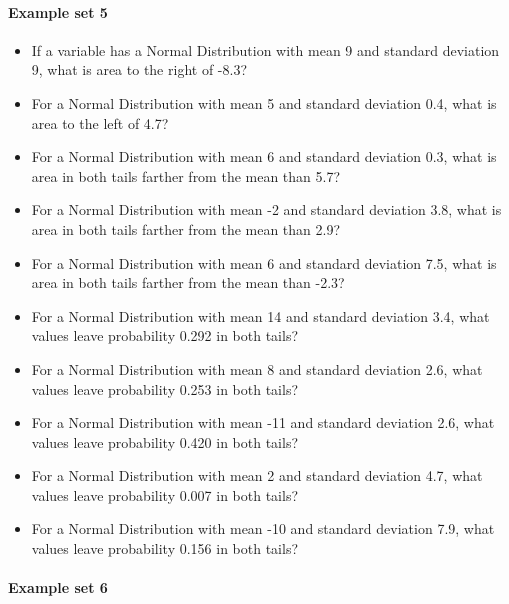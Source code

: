 \documentclass[]{article}
\providecommand{\tightlist}{%
  \setlength{\itemsep}{0pt}\setlength{\parskip}{0pt}}
\let\oldparagraph\paragraph
\renewcommand{\paragraph}[1]{\oldparagraph{#1}\mbox{}}
\begin{document}
\paragraph{Example set 5}\label{example-set-5}

\begin{itemize}
\tightlist
\item
  If a variable has a Normal Distribution with mean 9 and standard
  deviation 9, what is area to the right of -8.3?
\item
  For a Normal Distribution with mean 5 and standard deviation 0.4, what
  is area to the left of 4.7?
\item
  For a Normal Distribution with mean 6 and standard deviation 0.3, what
  is area in both tails farther from the mean than 5.7?
\item
  For a Normal Distribution with mean -2 and standard deviation 3.8,
  what is area in both tails farther from the mean than 2.9?
\item
  For a Normal Distribution with mean 6 and standard deviation 7.5, what
  is area in both tails farther from the mean than -2.3?
\item
  For a Normal Distribution with mean 14 and standard deviation 3.4,
  what values leave probability 0.292 in both tails?
\item
  For a Normal Distribution with mean 8 and standard deviation 2.6, what
  values leave probability 0.253 in both tails?
\item
  For a Normal Distribution with mean -11 and standard deviation 2.6,
  what values leave probability 0.420 in both tails?
\item
  For a Normal Distribution with mean 2 and standard deviation 4.7, what
  values leave probability 0.007 in both tails?
\item
  For a Normal Distribution with mean -10 and standard deviation 7.9,
  what values leave probability 0.156 in both tails?
\end{itemize}

\paragraph{Example set 6}\label{example-set-6}
\end{document}
